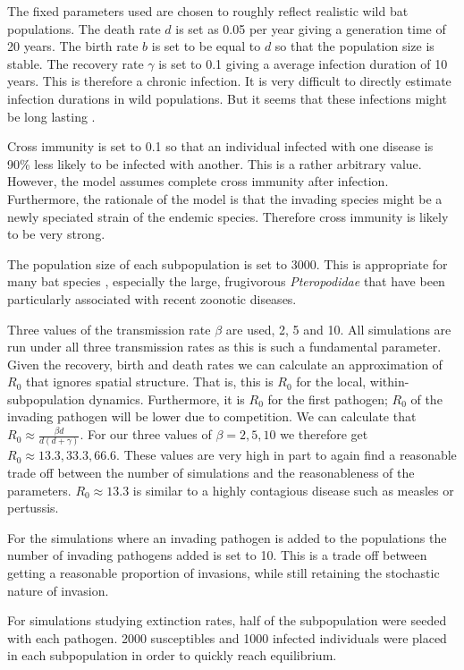 The fixed parameters used are chosen to roughly reflect realistic wild bat populations. 
The death rate $d$ is set as 0.05 per year giving a generation time of 20 years.
The birth rate $b$ is set to be equal to $d$ so that the population size is stable.
The recovery rate $\gamma$ is set to 0.1 giving a average infection duration of 10 years. 
This is therefore a chronic infection. 
It is very difficult to directly estimate infection durations in wild populations.
But it seems that these infections might be long lasting \cite{}.

Cross immunity is set to 0.1 so that an individual infected with one disease is 90\% less likely to be infected with another.
This is a rather arbitrary value.
However, the model assumes complete cross immunity after infection.
Furthermore, the rationale of the model is that the invading species might be a newly speciated strain of the endemic species.
Therefore cross immunity is likely to be very strong.

The population size of each subpopulation is set to 3000. 
This is appropriate for many bat species \cite{jones2009pantheria}, especially the large, frugivorous \emph{Pteropodidae} that have been particularly associated with recent zoonotic diseases.


Three values of the transmission rate $\beta$ are used, 2, 5 and 10.
All simulations are run under all three transmission rates as this is such a fundamental parameter.
Given the recovery, birth and death rates we can calculate an approximation of $R_0$ that ignores spatial structure.
That is, this is $R_0$ for the local, within-subpopulation dynamics.
Furthermore, it is $R_0$ for the first pathogen; $R_0$ of the invading pathogen will be lower due to competition.
We can calculate that $R_0 \approx \frac{\beta d}{d(d+ \gamma)}$.
For our three values of $\beta = 2, 5, 10$ we therefore get $R_0 \approx 13.3, 33.3, 66.6$.
These values are very high in part to again find a reasonable trade off between the number of simulations and the reasonableness of the parameters.
$R_0 \approx 13.3$ is similar to a highly contagious disease such as measles or pertussis. 


For the simulations where an invading pathogen is added to the populations the number of invading pathogens added is set to 10. 
This is a trade off between getting a reasonable proportion of invasions, while still retaining the stochastic nature of invasion.

For simulations studying extinction rates, half of the subpopulation were seeded with each pathogen.
2000 susceptibles and 1000 infected individuals were placed in each subpopulation in order to quickly reach equilibrium.






